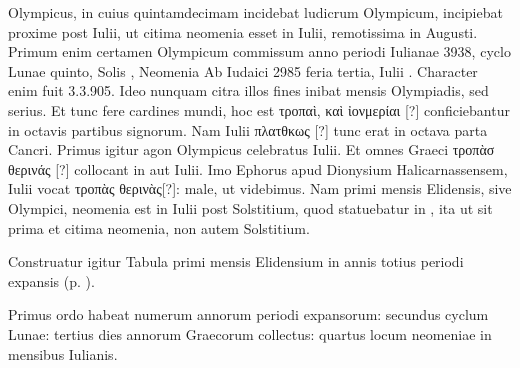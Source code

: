 Olympicus, in cuius quintamdecimam incidebat ludicrum Olympicum,
incipiebat proxime post  Iulii, ut citima neomenia esset
 in 
Iulii, remotissima in  Augusti.
Primum enim certamen Olympicum
commissum anno periodi Iulianae 3938, cyclo Lunae quinto, Solis ,
Neomenia Ab Iudaici 2985 feria tertia, Iulii .
Character enim fuit
3.3.905.
Ideo nunquam citra illos fines inibat mensis Olympiadis, sed
serius.
Et tunc fere cardines mundi, hoc est
 \textgreek{τροπαὶ, καὶ ἰονμερίαι [?]} conficiebantur
in octavis partibus signorum.
Nam  Iulii \textgreek{πλατθκως [?]} tunc
erat in octava parta Cancri.
Primus igitur agon Olympicus celebratus
 Iulii.
Et omnes Graeci \textgreek{τροπὰσ θερινάς [?]} collocant in
  aut 
Iulii.
Imo Ephorus apud Dionysium Halicarnassensem,  Iulii vocat
\textgreek{τροπὰς θερινὰς[?]}: male, ut videbimus.
Nam primi mensis Elidensis, sive
Olympici, neomenia est in  Iulii post Solstitium, quod statuebatur
in , ita ut  sit prima et citima neomenia,
 non autem Solstitium.


Construatur igitur Tabula primi mensis Elidensium
 in annis totius periodi
expansis (p. \pageref{tab:p038}).
\begin{table}[htbp]
 
\end{table}
%
Primus ordo habeat numerum annorum periodi expansorum:
secundus cyclum Lunae: tertius dies annorum Graecorum collectus:
quartus locum neomeniae in mensibus Iulianis.


